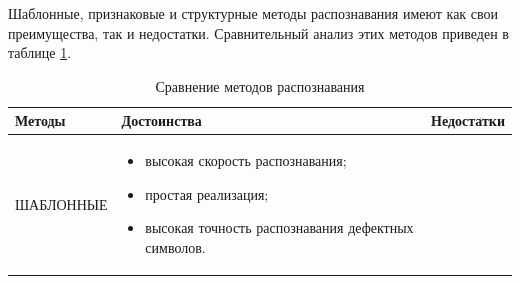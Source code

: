Шаблонные, признаковые и структурные методы распознавания имеют как свои
преимущества, так и недостатки. Сравнительный анализ этих методов приведен в
таблице \ref{intro_table_review}.
\begin{table}[]
\caption{Сравнение методов распознавания}
\label{intro_table_review}
\fontsize{12pt}{14pt}\selectfont
\begin{tabularx}{\linewidth}{l X X}
\toprule
\textbf{Методы}      & \textbf{Достоинства} & \textbf{Недостатки} \\
\midrule
\midrule
ШАБЛОННЫЕ   &   \begin{itemize}[leftmargin=*,nosep]
 \item высокая скорость распознавания;
 \item простая реализация;
 \item высокая точность распознавания дефектных символов.
\end{itemize} 


\end{tabularx}
\end{table}
